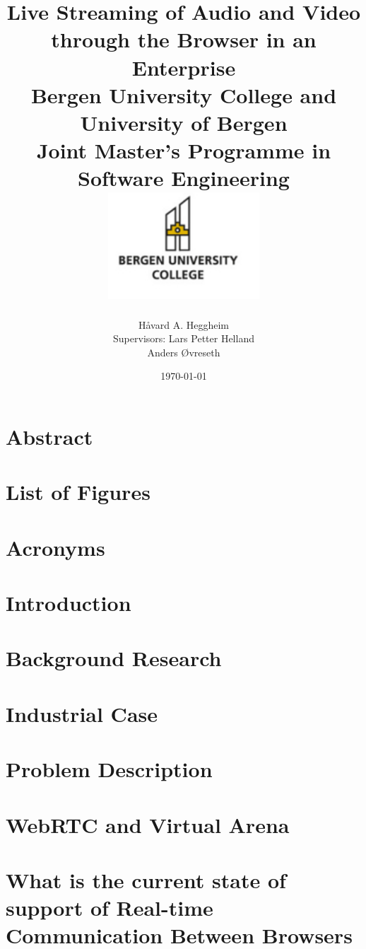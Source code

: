 \documentclass[11pt,a4paper]{report}
\author{H\aa vard A. Heggheim\\[1cm]
Supervisors: Lars Petter Helland\\Anders Øvreseth}
\date{\today}
\title{
 {\huge Live Streaming of Audio and Video through the Browser in an Enterprise}\\[0.4cm]
 {\large Bergen University College and University of Bergen}\\
 {\large Joint Master's Programme in Software Engineering}\\[1cm]
 {\includegraphics[height=4cm]{hib_small.jpg}}
}
\begin{document}
\maketitle


\chapter*{Abstract}


\tableofcontents

\chapter*{List of Figures}

\chapter*{Acronyms}




\chapter{Introduction}

\chapter{Background Research}
%

\chapter{Industrial Case}
%

\chapter{Problem Description}


\chapter{WebRTC and Virtual Arena}


\chapter{What is the current state of support of Real-time Communication Between Browsers}
\end{document}
